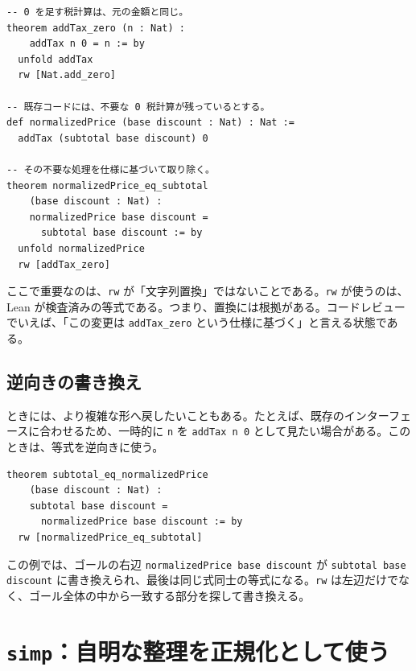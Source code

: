 \begin{listing}[htbp]
\begin{verbatim}
-- 0 を足す税計算は、元の金額と同じ。
theorem addTax_zero (n : Nat) :
    addTax n 0 = n := by
  unfold addTax
  rw [Nat.add_zero]

-- 既存コードには、不要な 0 税計算が残っているとする。
def normalizedPrice (base discount : Nat) : Nat :=
  addTax (subtotal base discount) 0

-- その不要な処理を仕様に基づいて取り除く。
theorem normalizedPrice_eq_subtotal
    (base discount : Nat) :
    normalizedPrice base discount =
      subtotal base discount := by
  unfold normalizedPrice
  rw [addTax_zero]
\end{verbatim}
\caption{\texttt{rw} による仕様ベースの置換}
\label{lst:ch12-rw}
\end{listing}

ここで重要なのは、\texttt{rw} が「文字列置換」ではないことである。\texttt{rw} が使うのは、Lean が検査済みの等式である。つまり、置換には根拠がある。コードレビューでいえば、「この変更は \texttt{addTax\_zero} という仕様に基づく」と言える状態である。

\subsection{逆向きの書き換え}

ときには、より複雑な形へ戻したいこともある。たとえば、既存のインターフェースに合わせるため、一時的に \texttt{n} を \texttt{addTax n 0} として見たい場合がある。このときは、等式を逆向きに使う。

\begin{listing}[htbp]
\begin{verbatim}
theorem subtotal_eq_normalizedPrice
    (base discount : Nat) :
    subtotal base discount =
      normalizedPrice base discount := by
  rw [normalizedPrice_eq_subtotal]
\end{verbatim}
\caption{等式を逆向きに使う}
\label{lst:ch12-rw-backward}
\end{listing}

この例では、ゴールの右辺 \texttt{normalizedPrice base discount} が \texttt{subtotal base discount} に書き換えられ、最後は同じ式同士の等式になる。\texttt{rw} は左辺だけでなく、ゴール全体の中から一致する部分を探して書き換える。

\section{\texttt{simp}：自明な整理を正規化として使う}


